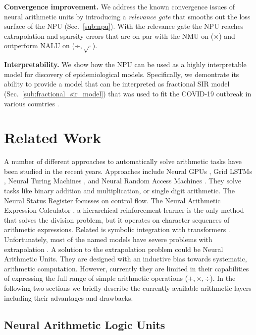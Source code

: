 \documentclass[9pt]{article}
\begin{document}
\textbf{Convergence improvement.}
We address the known convergence issues of neural arithmetic units by introducing a
\emph{relevance gate} that smooths out the loss surface of the NPU
(Sec.~\ref{sub:npu}). With the relevance gate the NPU reaches extrapolation and
sparsity errors that are on par with the NMU on ($\times$) and outperform NALU
on ($\div,\sqrt{\cdot}$).

\textbf{Interpretability.}
We show how the NPU can be used as a highly interpretable model for discovery of epidemiological models. 
Specifically, we demontrate its ability to provide a model that can be interpreted as fractional SIR model (Sec.~\ref{sub:fractional_sir_model})
that was used to fit the COVID-19 outbreak in various countries
\citep{taghvaei_fractional_2020}.

\section{Related Work}%
\label{sec:related_work}

A number of different approaches to automatically solve arithmetic tasks have
been studied in the recent years. Approaches include Neural GPUs
\citep{kaiser_neural_2016}, Grid LSTMs \citep{kalchbrenner_grid_2016}, Neural
Turing Machines \citep{graves_neural_2014}, and Neural Random Access Machines
\citep{kurach_neural_2016}. They solve tasks like binary addition and
multiplication, or single digit arithmetic. The Neural Status Register
\citep{faber_neural_2020} focusses on control flow.  The Neural Arithmetic
Expression Calculator \citep{chen_neural_2018}, a hierarchical reinforcement
learner is the only method that solves the division problem, but it operates on
character sequences of arithmetic expressions. Related is symbolic integration
with transformers \citep{lample_deep_2019}. Unfortunately, most of the named models
have severe problems with extrapolation \citep{madsen_measuring_2019,saxton_analysing_2019}.
A solution to the extrapolation problem could be Neural Arithmetic Units. They are
designed with an inductive bias towards systematic, arithmetic computation.
However, currently they are limited in their capabilities of expressing the full
range of simple arithmetic operations ($+,\times,\div$).
In the following two sections we briefly describe the currently available
arithmetic layers including their advantages and drawbacks.

\subsection{Neural Arithmetic Logic Units}%
\label{sub:neural_arithmetic_logic_unit}
\end{document}

